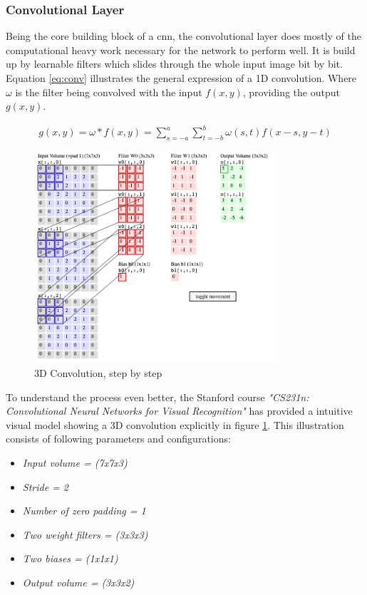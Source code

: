 \documentclass[USenglish]{ifimaster}  %
\begin{document}
\subsubsection{Convolutional Layer}
Being the core building block of a \ac{cnn}, the convolutional layer does mostly of the computational heavy work necessary for the network to perform well. 
It is build up by learnable filters which slides through the whole input image bit by bit. Equation \ref{eq:conv} illustrates the general expression of a 1D convolution. Where $\omega$ is the filter being convolved with the input $f(x,y)$, providing the output $g(x,y)$. 

\begin{equation}\label{eq:conv}
\begin{aligned}
g(x,y) = \omega * f(x,y) = \sum_{s=-a}^{a}\sum_{t=-b}^{b}\omega(s,t)f(x-s,y-t)
\end{aligned}
\end{equation}

\begin{figure}[ht]
    \centering
    \includegraphics[width=0.8\textwidth]{bilder/conv2.png}
    \caption{3D Convolution, step by step \cite{website:cs231n}}
    \label{fig:conv}
\end{figure}

To understand the process even better, the Stanford course \textit{"CS231n:  Convolutional  Neural  Networks  for  Visual Recognition"} has provided a intuitive visual model showing a 3D convolution explicitly in figure \ref{fig:conv}. This illustration consists of following parameters and configurations:

\begin{itemize}
    \item \textit{Input volume = (7x7x3)}
    \item \textit{Stride = 2}
    \item \textit{Number of zero padding = 1}
    \item \textit{Two weight filters = (3x3x3)}
    \item \textit{Two biases = (1x1x1)}
    \item \textit{Output volume = (3x3x2)}
\end{itemize}
\end{document}
